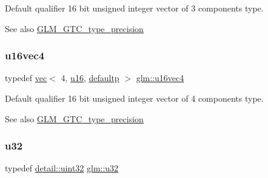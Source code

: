Default qualifier 16 bit unsigned integer vector of 3 components type. \begin{DoxySeeAlso}{See also}
\mbox{\hyperlink{group__gtc__type__precision}{G\+L\+M\+\_\+\+G\+T\+C\+\_\+type\+\_\+precision}} 
\end{DoxySeeAlso}
\mbox{\label{group__gtc__type__precision_ga049d45ad8d0f78578d7ceb86a7fdaae4}} 
\subsubsection{\texorpdfstring{u16vec4}{u16vec4}}
{\footnotesize\ttfamily typedef \mbox{\hyperlink{structglm_1_1vec}{vec}}$<$ 4, \mbox{\hyperlink{group__gtc__type__precision_gae7a1571503f83d2264ddfa705a6b082a}{u16}}, \mbox{\hyperlink{namespaceglm_a36ed105b07c7746804d7fdc7cc90ff25a9d21ccd8b5a009ec7eb7677befc3bf51}{defaultp}} $>$ \mbox{\hyperlink{group__gtc__type__precision_ga049d45ad8d0f78578d7ceb86a7fdaae4}{glm\+::u16vec4}}}

Default qualifier 16 bit unsigned integer vector of 4 components type. \begin{DoxySeeAlso}{See also}
\mbox{\hyperlink{group__gtc__type__precision}{G\+L\+M\+\_\+\+G\+T\+C\+\_\+type\+\_\+precision}} 
\end{DoxySeeAlso}
\mbox{\label{group__gtc__type__precision_ga54e837745059fd29017bed71cfa0a8db}} 
\subsubsection{\texorpdfstring{u32}{u32}}
{\footnotesize\ttfamily typedef \mbox{\hyperlink{namespaceglm_1_1detail_ade6cfbf377022aaa391af8cd50489222}{detail\+::uint32}} \mbox{\hyperlink{group__gtc__type__precision_ga54e837745059fd29017bed71cfa0a8db}{glm\+::u32}}}

